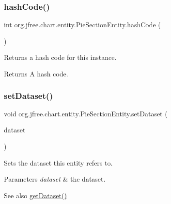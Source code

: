 \subsubsection{\texorpdfstring{hash\+Code()}{hashCode()}}
{\footnotesize\ttfamily int org.\+jfree.\+chart.\+entity.\+Pie\+Section\+Entity.\+hash\+Code (\begin{DoxyParamCaption}{ }\end{DoxyParamCaption})}

Returns a hash code for this instance.

\begin{DoxyReturn}{Returns}
A hash code. 
\end{DoxyReturn}
\mbox{\label{classorg_1_1jfree_1_1chart_1_1entity_1_1_pie_section_entity_aac16216f75526ce76572bb6c4ea9d5b9}} 
\subsubsection{\texorpdfstring{set\+Dataset()}{setDataset()}}
{\footnotesize\ttfamily void org.\+jfree.\+chart.\+entity.\+Pie\+Section\+Entity.\+set\+Dataset (\begin{DoxyParamCaption}\item[{\mbox{\hyperlink{interfaceorg_1_1jfree_1_1data_1_1general_1_1_pie_dataset}{Pie\+Dataset}}}]{dataset }\end{DoxyParamCaption})}

Sets the dataset this entity refers to.


\begin{DoxyParams}{Parameters}
{\em dataset} & the dataset.\\
\hline
\end{DoxyParams}
\begin{DoxySeeAlso}{See also}
\mbox{\hyperlink{classorg_1_1jfree_1_1chart_1_1entity_1_1_pie_section_entity_af99237b3035f9f95772f724f96a3c14d}{get\+Dataset()}} 
\end{DoxySeeAlso}
\mbox{\label{classorg_1_1jfree_1_1chart_1_1entity_1_1_pie_section_entity_a2c0d0c8d6eac5eddfef4a343ddf577a5}} 
